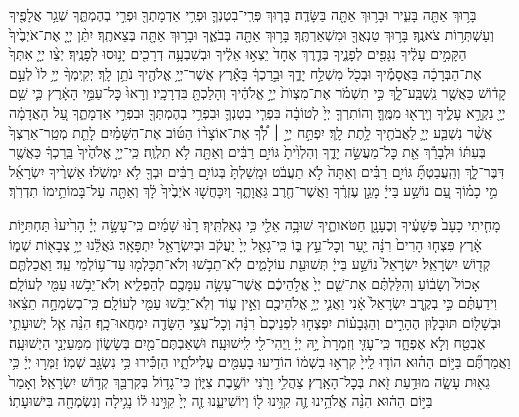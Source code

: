 \documentclass[twoside, openany, parskip=half, 11pt]{book}
\begin{document}
\begin{footnotesize}
בָּר֥וּךְ אַתָּ֖ה בָּעִ֑יר וּבָר֥וּךְ אַתָּ֖ה בַּשָּׂדֶֽה׃ בָּר֧וּךְ פְּרִֽי־בִטְנְךָ֛ וּפְרִ֥י אַדְמָתְךָ֖ וּפְרִ֣י בְהֶמְתֶּ֑ךָ שְׁגַ֥ר אֲלָפֶ֖יךָ וְעַשְׁתְּר֥וֹת צֹאנֶֽךָ׃ בָּר֥וּךְ טַנְאֲךָ֖ וּמִשְׁאַרְתֶּֽךָ׃ בָּר֥וּךְ אַתָּ֖ה בְּבֹאֶ֑ךָ וּבָר֥וּךְ אַתָּ֖ה בְּצֵאתֶֽךָ׃ יִתֵּ֨ן יְיָ֤ אֶת־אֹיְבֶ֙יךָ֙ הַקָּמִ֣ים עָלֶ֔יךָ נִגָּפִ֖ים לְפָנֶ֑יךָ בְּדֶ֤רֶךְ אֶחָד֙ יֵצְא֣וּ אֵלֶ֔יךָ וּבְשִׁבְעָ֥ה דְרָכִ֖ים יָנ֥וּסוּ לְפָנֶֽיךָ׃ יְצַ֨ו יְיָ֤ אִתְּךָ֙ אֶת־הַבְּרָכָ֔ה בַּאֲסָמֶ֕יךָ וּבְכֹ֖ל מִשְׁלַ֣ח יָדֶ֑ךָ וּבֵ֣רַכְךָ֔ בָּאָ֕רֶץ אֲשֶׁר־יְיָ֥ אֱלֹהֶ֖יךָ נֹתֵ֥ן לָֽךְ׃ יְקִֽימְךָ֨ יְיָ֥ לוֹ֙ לְעַ֣ם קָד֔וֹשׁ כַּאֲשֶׁ֖ר נִֽשְׁבַּֽע־לָ֑ךְ כִּ֣י תִשְׁמֹ֗ר אֶת־מִצְוֺת֙ יְיָ֣ אֱלֹהֶ֔יךָ וְהָלַכְתָּ֖ בִּדְרָכָֽיו׃ וְרָאוּ֙ כׇּל־עַמֵּ֣י הָאָ֔רֶץ כִּ֛י שֵׁ֥ם יְיָ֖ נִקְרָ֣א עָלֶ֑יךָ וְיָֽרְא֖וּ מִמֶּֽךָּ׃ וְהוֹתִרְךָ֤ יְיָ֙ לְטוֹבָ֔ה בִּפְרִ֧י בִטְנְךָ֛ וּבִפְרִ֥י בְהֶמְתְּךָ֖ וּבִפְרִ֣י אַדְמָתֶ֑ךָ עַ֚ל הָאֲדָמָ֔ה אֲשֶׁ֨ר נִשְׁבַּ֧ע יְיָ֛ לַאֲבֹתֶ֖יךָ לָ֥תֶת לָֽךְ׃ יִפְתַּ֣ח יְיָ֣ ׀ לְ֠ךָ֠ אֶת־אוֹצָר֨וֹ הַטּ֜וֹב אֶת־הַשָּׁמַ֗יִם לָתֵ֤ת מְטַֽר־אַרְצְךָ֙ בְּעִתּ֔וֹ וּלְבָרֵ֕ךְ אֵ֖ת כׇּל־מַעֲשֵׂ֣ה יָדֶ֑ךָ וְהִלְוִ֙יתָ֙ גּוֹיִ֣ם רַבִּ֔ים וְאַתָּ֖ה לֹ֥א תִלְוֶֽה׃
%
כִּֽי־יְיָ֤ אֱלֹהֶ֙יךָ֙ בֵּֽרַכְךָ֔ כַּאֲשֶׁ֖ר דִּבֶּר־לָ֑ךְ וְהַֽעֲבַטְתָּ֞ גּוֹיִ֣ם רַבִּ֗ים וְאַתָּה֙ לֹ֣א תַעֲבֹ֔ט וּמָֽשַׁלְתָּ֙ בְּגוֹיִ֣ם רַבִּ֔ים וּבְךָ֖ לֹ֥א יִמְשֹֽׁלוּ׃
%
אַשְׁרֶ֨יךָ‏ יִשְׂרָאֵ֜ל מִ֣י כָמ֗וֹךָ עַ֚ם נוֹשַׁ֣ע בַּייָ֔ מָגֵ֣ן עֶזְרֶ֔ךָ וַאֲשֶׁר־חֶ֖רֶב גַּאֲוָתֶ֑ךָ וְיִכָּחֲשׁ֤וּ אֹיְבֶ֙יךָ֙ לָ֔ךְ וְאַתָּ֖ה עַל־בָּמוֹתֵ֥ימוֹ תִדְרֹֽךְ׃

%
מָחִ֤יתִי כָעָב֙ פְּשָׁעֶ֔יךָ וְכֶעָנָ֖ן חַטֹּאותֶ֑יךָ שׁוּבָ֥ה אֵלַ֖י כִּ֥י גְאַלְתִּֽיךָ׃ רָנּ֨וּ שָׁמַ֜יִם כִּֽי־עָשָׂ֣ה יְיָ֗ הָרִ֙יעוּ֙ תַּחְתִּיּ֣וֹת אָ֔רֶץ פִּצְח֤וּ הָרִים֙ רִנָּ֔ה יַ֖עַר וְכׇל־עֵ֣ץ בּ֑וֹ כִּֽי־גָאַ֤ל יְיָ֙ יַעֲקֹ֔ב וּבְיִשְׂרָאֵ֖ל יִתְפָּאָֽר׃
%
גֹּאֲלֵ֕נוּ יְיָ֥ צְבָא֖וֹת שְׁמ֑וֹ קְד֖וֹשׁ יִשְׂרָאֵֽל׃
%
יִשְׂרָאֵל֙ נוֹשַׁ֣ע בַּייָ֔ תְּשׁוּעַ֖ת עוֹלָמִ֑ים לֹֽא־תֵבֹ֥שׁוּ וְלֹא־תִכָּלְמ֖וּ עַד־ע֥וֹלְמֵי עַֽד׃
%
וַאֲכַלְתֶּ֤ם אָכוֹל֙ וְשָׂב֔וֹעַ וְהִלַּלְתֶּ֗ם אֶת־שֵׁ֤ם יְיָ֙ אֱלֹ֣הֵיכֶ֔ם אֲשֶׁר־עָשָׂ֥ה עִמָּכֶ֖ם לְהַפְלִ֑יא וְלֹא־יֵבֹ֥שׁוּ עַמִּ֖י לְעוֹלָֽם׃ וִידַעְתֶּ֗ם כִּ֣י בְקֶ֤רֶב יִשְׂרָאֵל֙ אָ֔נִי וַאֲנִ֛י יְיָ֥ אֱלֹהֵיכֶ֖ם וְאֵ֣ין ע֑וֹד וְלֹֽא־יֵבֹ֥שׁוּ עַמִּ֖י לְעוֹלָֽם׃
%
כִּֽי־בְשִׂמְחָ֣ה תֵצֵ֔אוּ וּבְשָׁל֖וֹם תּוּבָל֑וּן הֶהָרִ֣ים וְהַגְּבָע֗וֹת יִפְצְח֤וּ לִפְנֵיכֶם֙ רִנָּ֔ה וְכׇל־עֲצֵ֥י הַשָּׂדֶ֖ה יִמְחֲאוּ־כָֽף׃
%
הִנֵּ֨ה אֵ֧ל יְשׁוּעָתִ֛י אֶבְטַ֖ח וְלֹ֣א אֶפְחָ֑ד כִּֽי־עׇזִּ֤י וְזִמְרָת֙ יָ֣הּ יְיָ֔ וַֽיְהִי־לִ֖י לִֽישׁוּעָֽה׃ וּשְׁאַבְתֶּם־מַ֖יִם בְּשָׂשׂ֑וֹן מִמַּעַיְנֵ֖י הַיְשׁוּעָֽה׃ וַאֲמַרְתֶּ֞ם בַּיּ֣וֹם הַה֗וּא הוֹד֤וּ לַֽייָ֙ קִרְא֣וּ בִשְׁמ֔וֹ הוֹדִ֥יעוּ בָעַמִּ֖ים עֲלִילֹתָ֑יו הַזְכִּ֕ירוּ כִּ֥י נִשְׂגָּ֖ב שְׁמֽוֹ׃ זַמְּר֣וּ יְיָ֔ כִּ֥י גֵא֖וּת עָשָׂ֑ה מוּדַ֥עַת זֹ֖את בְּכׇל־הָאָֽרֶץ׃ צַהֲלִ֥י וָרֹ֖נִּי יוֹשֶׁ֣בֶת צִיּ֑וֹן כִּי־גָד֥וֹל בְּקִרְבֵּ֖ךְ קְד֥וֹשׁ יִשְׂרָאֵֽל׃
%
וְאָמַר֙ בַּיּ֣וֹם הַה֔וּא הִנֵּ֨ה אֱלֹהֵ֥ינוּ זֶ֛ה קִוִּ֥ינוּ ל֖וֹ וְיוֹשִׁיעֵ֑נוּ זֶ֤ה יְיָ֙ קִוִּ֣ינוּ ל֔וֹ נָגִ֥ילָה וְנִשְׂמְחָ֖ה בִּישׁוּעָתֽוֹ׃


\end{footnotesize}
\end{document}
